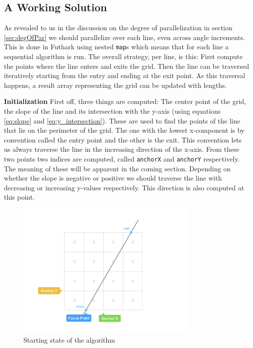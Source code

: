 \subsection{A Working Solution}
As revealed to us in the discussion on the degree of parallelization in section \ref{sec:degOfPar} we should parallelize over each line, even across angle increments. This is done in Futhark using nested \texttt{map}s which means that for each line a sequential algorithm is run. The overall strategy, per line, is this: First compute the points where the line enters and exits the grid. Then the line can be traversed iteratively starting from the entry and ending at the exit point. As this traversal happens, a result array representing the grid can be updated with lengths.

\textbf{Initialization}\newline
First off, three things are computed: The center point of the grid, the slope of the line and its intersection with the y-axis (using equations \eqref{eq:slope} and \eqref{eq:y_intersection}). These are used to find the points of the line that lie on the perimeter of the grid. The one with the lowest x-component is by convention called the entry point and the other is the exit. This convention lets us always traverse the line in the increasing direction of the x-axis. From these two points two indices are computed, called \texttt{anchorX} and \texttt{anchorY} respectively. The meaning of these will be apparent in the coming section. Depending on whether the slope is negative or positive we should traverse the line with decreasing or increasing y-values respectively. This direction is also computed at this point.
\begin{figure}[H] 
  \centering
  \includegraphics[width=0.8\textwidth]{figures/alg_init.png}
  \caption{Starting state of the algorithm}
  \label{fig:alg_init}
\end{figure}
